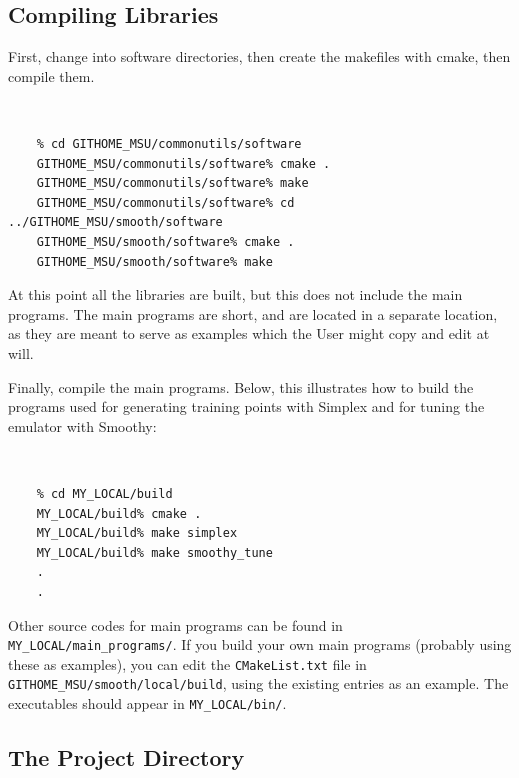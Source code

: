 \documentclass[UserManual.tex]{subfiles}
\begin{document}
\subsection{Compiling Libraries }

First, change into software directories, then create the makefiles with cmake, then compile them.\\
{\tt 
\begin{verbatim}
    % cd GITHOME_MSU/commonutils/software
    GITHOME_MSU/commonutils/software% cmake .
    GITHOME_MSU/commonutils/software% make
    GITHOME_MSU/commonutils/software% cd ../GITHOME_MSU/smooth/software
    GITHOME_MSU/smooth/software% cmake .
    GITHOME_MSU/smooth/software% make
\end{verbatim}
}
At this point all the libraries are built, but this does not include the main programs. The main programs are short, and are located in a separate location, as they are meant to serve as examples which the User might copy and edit at will.

Finally, compile the main programs. Below, this illustrates how to build the programs used for generating training points with Simplex and for tuning the emulator with Smoothy:
{\tt
\begin{verbatim}
    % cd MY_LOCAL/build
    MY_LOCAL/build% cmake .
    MY_LOCAL/build% make simplex
    MY_LOCAL/build% make smoothy_tune
    .
    .
\end{verbatim}
}
Other source codes for main programs can be found in {\tt MY\_LOCAL/main\_programs/}. If you build your own main programs (probably using these as examples), you can edit the {\tt CMakeList.txt} file in {\tt GITHOME\_MSU/smooth/local/build}, using the existing entries as an example. The executables should appear in {\tt MY\_LOCAL/bin/}. 

\subsection{The Project Directory}
\end{document}
